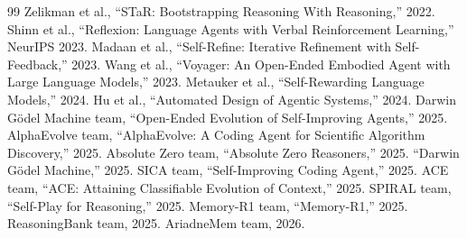 \documentclass[11pt,a4paper]{article}
\begin{document}



\begin{thebibliography}{99}
 Zelikman et al., ``STaR: Bootstrapping Reasoning With Reasoning,'' 2022.
 Shinn et al., ``Reflexion: Language Agents with Verbal Reinforcement Learning,'' NeurIPS 2023.
 Madaan et al., ``Self-Refine: Iterative Refinement with Self-Feedback,'' 2023.
 Wang et al., ``Voyager: An Open-Ended Embodied Agent with Large Language Models,'' 2023.
 Metauker et al., ``Self-Rewarding Language Models,'' 2024.
 Hu et al., ``Automated Design of Agentic Systems,'' 2024.
 Darwin G\"{o}del Machine team, ``Open-Ended Evolution of Self-Improving Agents,'' 2025.
 AlphaEvolve team, ``AlphaEvolve: A Coding Agent for Scientific Algorithm Discovery,'' 2025.
 Absolute Zero team, ``Absolute Zero Reasoners,'' 2025.
 ``Darwin G\"{o}del Machine,'' 2025.
 SICA team, ``Self-Improving Coding Agent,'' 2025.
 ACE team, ``ACE: Attaining Classifiable Evolution of Context,'' 2025.
 SPIRAL team, ``Self-Play for Reasoning,'' 2025.
 Memory-R1 team, ``Memory-R1,'' 2025.
 ReasoningBank team, 2025.
 AriadneMem team, 2026.
\end{thebibliography}
\end{document}
